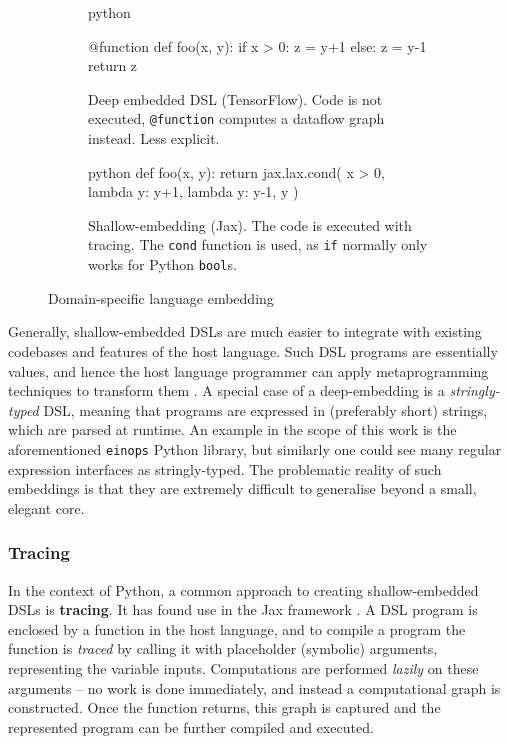 \begin{figure}[h]
\centering
\begin{subfigure}{.4\textwidth}
  \centering
    \begin{cminted}{python}

@function
def foo(x, y):
  if x > 0: z = y+1
  else:     z = y-1
  return z

    \end{cminted}
      \caption{Deep embedded DSL (TensorFlow). Code is not executed, \texttt{@function} computes a dataflow graph instead. Less explicit.}
\end{subfigure} \quad %
\begin{subfigure}{.4\textwidth}
  \centering
  \begin{cminted}{python}
def foo(x, y):
  return jax.lax.cond(
    x > 0, 
    lambda y: y+1, 
    lambda y: y-1, 
    y
  )
  \end{cminted}
  \caption{Shallow-embedding (Jax). The code is executed with tracing. The \texttt{cond} function is used, as \texttt{if} normally only works for Python \texttt{bool}s.}
\end{subfigure}
\caption{Domain-specific language embedding}
\label{fig:point-arrays}
\end{figure}

Generally, shallow-embedded DSLs are much easier to integrate with existing codebases and features of the host language.
Such DSL programs are essentially values, and hence the host language programmer can apply metaprogramming techniques to transform them \cite{atkey2009unembedding}. 
A special case of a deep-embedding is a \textit{stringly-typed} DSL, meaning that programs are expressed in (preferably short) strings, which are parsed at runtime. An example in the scope of this work is the aforementioned \texttt{einops} Python library, but similarly one could see many regular expression interfaces as stringly-typed. The problematic reality of such embeddings is that they are extremely difficult to generalise beyond a small, elegant core.

\subsubsection{Tracing} \label{tracing}

In the context of Python, a common approach to creating shallow-embedded DSLs is \textbf{tracing}. It has found use in the Jax framework \cite{frostig2018compiling}. A DSL program is enclosed by a function in the host language, and to compile a program the function is \textit{traced} by calling it with placeholder (symbolic) arguments, representing the variable inputs. Computations are performed \textit{lazily} on these arguments -- no work is done immediately, and instead a computational graph is constructed. Once the function returns, this graph is captured and the represented program can be further compiled and executed.

